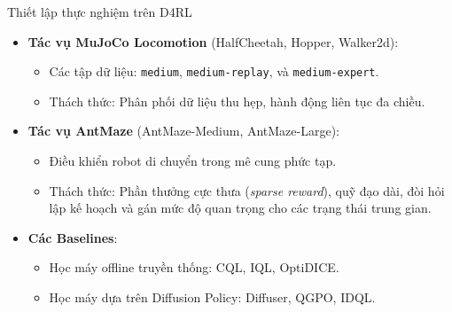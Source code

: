 \begin{frame}{Thiết lập thực nghiệm trên D4RL}
    \begin{itemize}
        \item \textbf{Tác vụ MuJoCo Locomotion} (HalfCheetah, Hopper, Walker2d):
        \begin{itemize}
            \item Các tập dữ liệu: \texttt{medium}, \texttt{medium-replay}, và \texttt{medium-expert}.
            \item Thách thức: Phân phối dữ liệu thu hẹp, hành động liên tục đa chiều.
        \end{itemize}
        \item \textbf{Tác vụ AntMaze} (AntMaze-Medium, AntMaze-Large):
        \begin{itemize}
            \item Điều khiển robot di chuyển trong mê cung phức tạp.
            \item Thách thức: Phần thưởng cực thưa (\textit{sparse reward}), quỹ đạo dài, đòi hỏi lập kế hoạch và gán mức độ quan trọng cho các trạng thái trung gian.
        \end{itemize}
        \item \textbf{Các Baselines}:
        \begin{itemize}
            \item Học máy offline truyền thống: CQL, IQL, OptiDICE.
            \item Học máy dựa trên Diffusion Policy: Diffuser, QGPO, IDQL.
        \end{itemize}
    \end{itemize}
\end{frame}

